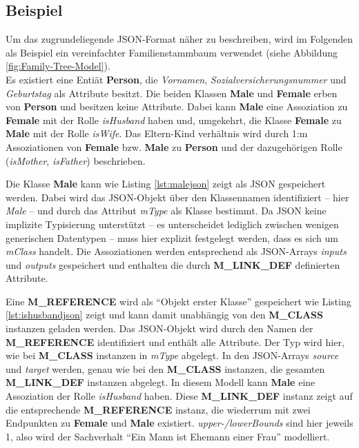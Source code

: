 \subsection{Beispiel}
Um das zugrundeliegende JSON-Format n\"aher zu beschreiben, wird im Folgenden als Beispiel ein vereinfachter Familienstammbaum verwendet (siehe Abbildung \ref{fig:Family-Tree-Model}).\\ 
Es existiert eine Entiät \textbf{Person}, die \textit{Vornamen}, \textit{Sozialversicherungsnummer} und \textit{Geburtstag} als Attribute besitzt. Die beiden Klassen \textbf{Male} und \textbf{Female} erben von \textbf{Person} und besitzen keine Attribute. Dabei kann \textbf{Male} eine Assoziation zu \textbf{Female} mit der Rolle \textit{isHusband} haben und, umgekehrt, die Klasse \textbf{Female} zu \textbf{Male} mit der Rolle \textit{isWife}. Das Eltern-Kind verh\"altnis wird durch 1:m Assoziationen von \textbf{Female} bzw. \textbf{Male} zu \textbf{Person} und der dazugeh\"origen Rolle (\textit{isMother}, \textit{isFather}) beschrieben.



Die Klasse \textbf{Male} kann wie Listing \ref{lst:malejson} zeigt als JSON gespeichert werden. Dabei wird das JSON-Objekt \"uber den Klassennamen identifiziert -- hier \textit{Male} -- und durch das Attribut \textit{mType} als Klasse bestimmt. Da JSON keine implizite Typisierung unterstützt -- es unterscheidet lediglich zwischen wenigen generischen Datentypen -- muss hier explizit festgelegt werden, dass es sich um \textit{mClass} handelt. Die Assoziationen werden entsprechend als JSON-Arrays \textit{inputs} und \textit{outputs} gespeichert und enthalten die durch \textbf{M\_LINK\_DEF} definierten Attribute.



Eine \textbf{M\_REFERENCE} wird als "`Objekt erster Klasse"' gespeichert wie Listing \ref{lst:ishusbandjson} zeigt und kann damit unabhängig von den \textbf{M\_CLASS} instanzen geladen werden. Das JSON-Objekt wird durch den Namen der \textbf{M\_REFERENCE} identifiziert und enth\"alt alle Attribute. Der Typ wird hier, wie bei \textbf{M\_CLASS} instanzen in \textit{mType} abgelegt. In den JSON-Arrays \textit{source} und \textit{target} werden, genau wie bei den \textbf{M\_CLASS} instanzen, die gesamten \textbf{M\_LINK\_DEF} instanzen abgelegt. In diesem Modell kann \textbf{Male} eine Assoziation der Rolle \textit{isHusband} haben. Diese \textbf{M\_LINK\_DEF} instanz zeigt auf die entsprechende \textbf{M\_REFERENCE} instanz, die wiederrum mit zwei Endpunkten zu \textbf{Female} und \textbf{Male} existiert. \textit{upper-/lowerBounds} sind hier jeweils 1, also wird der Sachverhalt "`Ein Mann ist Ehemann einer Frau"' modelliert.















